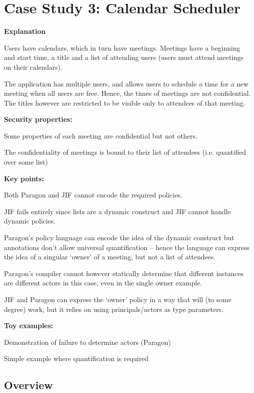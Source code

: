 \section{Case Study 3: Calendar Scheduler}

\textbf{Explanation}

Users have calendars, which in turn have meetings. Meetings have a beginning and start time, a title and a list of attending users (users must attend meetings on their calendars).

The application has multiple users, and allows users to schedule a time for a new meeting when all users are free. Hence, the times of meetings are not confidential. The titles however are restricted to be visible only to attendees of that meeting.

\textbf{Security properties:}

Some properties of each meeting are confidential but not others.

The confidentiality of meetings is bound to their list of attendees (i.e. quantified over some list)

\textbf{Key points:}

Both Paragon and JIF cannot encode the required policies.

JIF fails entirely since lists are a dynamic construct and JIF cannot handle dynamic policies.

Paragon's policy language can encode the idea of the dynamic construct but annotations don't allow universal quantification -- hence the language can express the idea of a singular `owner' of a meeting, but not a list of attendees.

Paragon's compiler cannot however statically determine that different instances are different actors in this case, even in the single owner example.

JIF and Paragon can express the `owner' policy in a way that will (to some degree) work, but it relies on using principals/actors as type parameters.

\textbf{Toy examples:}

Demonstration of failure to determine actors (Paragon)

Simple example where quantification is required

\newpage

\subsection{Overview}


